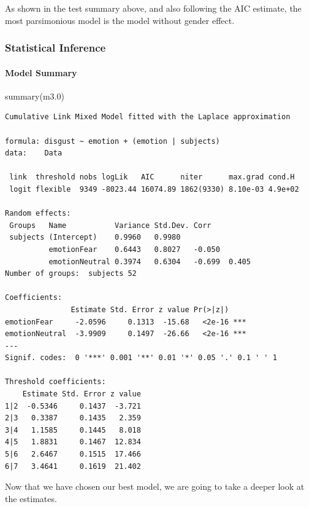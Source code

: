 \documentclass[
]{article}
\newenvironment{Shaded}{\begin{snugshade}}{\end{snugshade}}
\newcommand{\FloatTok}[1]{\textcolor[rgb]{0.00,0.00,0.81}{#1}}
\newcommand{\FunctionTok}[1]{\textcolor[rgb]{0.00,0.00,0.00}{#1}}
\newcommand{\NormalTok}[1]{#1}
\begin{document}
As shown in the test summary above, and also following the AIC estimate,
the most parsimonious model is the model without gender effect.

\hypertarget{statistical-inference}{%
\subsubsection{Statistical Inference}\label{statistical-inference}}

\hypertarget{model-summary}{%
\paragraph{Model Summary}\label{model-summary}}

\begin{Shaded}
\begin{Highlighting}[]
\FunctionTok{summary}\NormalTok{(m3}\FloatTok{.0}\NormalTok{)}
\end{Highlighting}
\end{Shaded}

\begin{verbatim}
Cumulative Link Mixed Model fitted with the Laplace approximation

formula: disgust ~ emotion + (emotion | subjects)
data:    Data

 link  threshold nobs logLik   AIC      niter      max.grad cond.H 
 logit flexible  9349 -8023.44 16074.89 1862(9330) 8.10e-03 4.9e+02

Random effects:
 Groups   Name           Variance Std.Dev. Corr          
 subjects (Intercept)    0.9960   0.9980                 
          emotionFear    0.6443   0.8027   -0.050        
          emotionNeutral 0.3974   0.6304   -0.699  0.405 
Number of groups:  subjects 52 

Coefficients:
               Estimate Std. Error z value Pr(>|z|)    
emotionFear     -2.0596     0.1313  -15.68   <2e-16 ***
emotionNeutral  -3.9909     0.1497  -26.66   <2e-16 ***
---
Signif. codes:  0 '***' 0.001 '**' 0.01 '*' 0.05 '.' 0.1 ' ' 1

Threshold coefficients:
    Estimate Std. Error z value
1|2  -0.5346     0.1437  -3.721
2|3   0.3387     0.1435   2.359
3|4   1.1585     0.1445   8.018
4|5   1.8831     0.1467  12.834
5|6   2.6467     0.1515  17.466
6|7   3.4641     0.1619  21.402
\end{verbatim}

Now that we have chosen our best model, we are going to take a deeper
look at the estimates.
\end{document}
